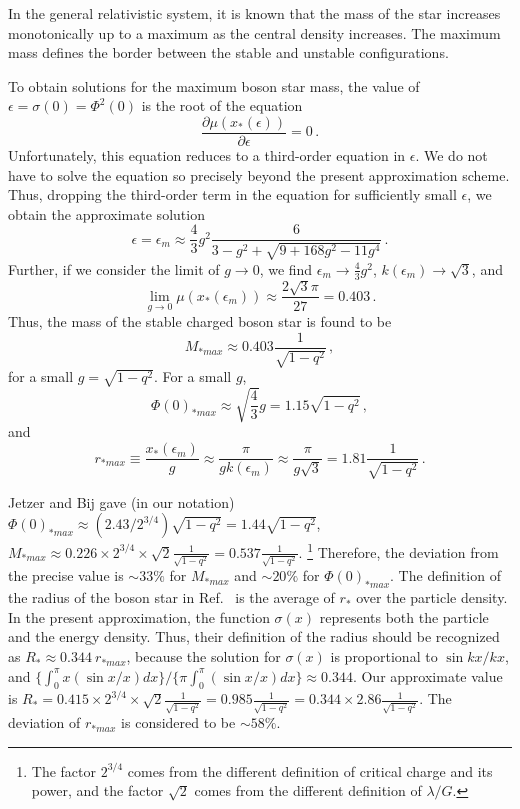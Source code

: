 \documentclass[
aps,prd,
12pt,%
nopreprintnumbers,
showpacs,
eqsecnum,
nofootinbib
]{revtex4-1}
\begin{document}
In the general relativistic system, it is known that the mass of the star
increases monotonically up to a maximum as the central density increases.
The maximum mass defines the border between the stable and unstable configurations.

To obtain solutions for the maximum boson star mass, the value of
$\epsilon=\sigma(0)=\Phi^2(0)$ is the root of the equation
\begin{equation}
\frac{\partial\mu(x_*(\epsilon))}{\partial\epsilon}=0\,.
\end{equation}
Unfortunately, this equation reduces to a third-order equation in $\epsilon$.
We do not have to solve the equation so precisely  beyond the present
approximation scheme. Thus, dropping the third-order term in the equation for
sufficiently small
$\epsilon$, we obtain the approximate solution
\begin{equation}
\epsilon=\epsilon_m\approx \frac{4}{3}g^2\frac{6}{3-g^2+\sqrt{9+168g^2-11g^4}}\,.
\end{equation}
Further, if we consider the limit of
$g\rightarrow 0$, we find $\epsilon_m\rightarrow\frac{4}{3}g^2$,
$k(\epsilon_m)\rightarrow \sqrt{3}$, and
\begin{equation}
\lim_{g\rightarrow 0}\mu(x_*(\epsilon_m))\approx\frac{2\sqrt{3}\pi}{27}=0.403\,.
\end{equation}
Thus, the mass of the stable charged boson star is found to be
\begin{equation}
M_{*max}\approx 0.403\frac{1}{\sqrt{1-q^2}}\,,
\end{equation}
for a small $g=\sqrt{1-q^2}$.
For a small $g$,
\begin{equation}
\Phi(0)_{*max}\approx\sqrt{\frac{4}{3}}g=1.15{\sqrt{1-q^2}}\,,
\end{equation}
and
\begin{equation}
r_{*max}\equiv
\frac{x_*(\epsilon_m)}{g}\approx\frac{\pi}{g
k(\epsilon_m)}\approx\frac{\pi}{g\sqrt{3}}=1.81\frac{1}{\sqrt{1-q^2}}\,.
\end{equation}

Jetzer and Bij \cite{Jetzer,JB} gave (in our notation) $\Phi(0)_{*max}\approx
(2.43/ 2^{3/4})\sqrt{1-q^2}=1.44\sqrt{1-q^2}$,
$M_{*max}\approx 0.226\times
2^{3/4}\times\sqrt{2}\frac{1}{\sqrt{1-q^2}}=0.537\frac{1}{\sqrt{1-q^2}}$.%
\footnote{The factor $2^{3/4}$ comes from the different definition of critical
charge and its power, and the factor $\sqrt{2}$ comes from the different
definition of $\lambda/G$.} Therefore, the deviation from the precise value is
$\sim\! 33\%$ for
$M_{*max}$ and
$\sim\! 20\%$ for $\Phi(0)_{*max}$.
The definition of the radius of the boson star in Ref.~\cite{Jetzer} is the average
of
$r_*$  over the particle density. In the present approximation, the function
$\sigma(x)$ represents both the particle and the energy density. Thus, their
definition of the radius should be recognized as
$R_*\approx 0.344~r_{*max}$, because the solution for $\sigma(x)$ is proportional
to
$\sin kx/kx$, and
$\{\int_0^\pi x(\sin x/x) dx\}/\{\pi\int_0^\pi (\sin x/x) dx\}\approx
0.344$. Our approximate value is
$R_*=0.415\times
2^{3/4}\times\sqrt{2}\frac{1}{\sqrt{1-q^2}}=0.985\frac{1}{\sqrt{1-q^2}}
=0.344\times 2.86\frac{1}{\sqrt{1-q^2}}$. The deviation of $r_{*max}$ is
considered to be $\sim\! 58\%$.
\end{document}
